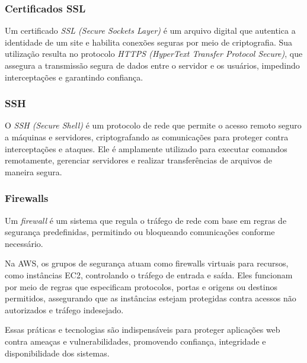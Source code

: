 \subsubsection{Certificados SSL}


Um certificado \emph{SSL (Secure Sockets Layer)} é um arquivo digital que autentica a identidade de um site e habilita conexões seguras por meio de criptografia. Sua utilização resulta no protocolo \emph{HTTPS (HyperText Transfer Protocol Secure)}, que assegura a transmissão segura de dados entre o servidor e os usuários, impedindo interceptações e garantindo confiança.

\subsubsection{SSH}


O \emph{SSH (Secure Shell)} é um protocolo de rede que permite o acesso remoto seguro a máquinas e servidores, criptografando as comunicações para proteger contra interceptações e ataques. Ele é amplamente utilizado para executar comandos remotamente, gerenciar servidores e realizar transferências de arquivos de maneira segura.

\subsubsection{Firewalls}


Um \emph{firewall} é um sistema que regula o tráfego de rede com base em regras de segurança predefinidas, permitindo ou bloqueando comunicações conforme necessário.

Na AWS, os grupos de segurança atuam como firewalls virtuais para recursos, como instâncias EC2, controlando o tráfego de entrada e saída. Eles funcionam por meio de regras que especificam protocolos, portas e origens ou destinos permitidos, assegurando que as instâncias estejam protegidas contra acessos não autorizados e tráfego indesejado.

Essas práticas e tecnologias são indispensáveis para proteger aplicações web contra ameaças e vulnerabilidades, promovendo confiança, integridade e disponibilidade dos sistemas.









